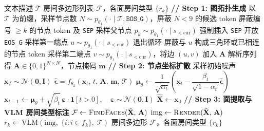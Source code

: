 \begin{algorithm}[H]
\caption{PlanDiffusion 推理}
\label{alg:inference}
\begin{algorithmic}[1]
\REQUIRE 文本描述 $\mathcal{T}$
\ENSURE 房间多边形列表 $\mathcal{F}$，各面房间类型 $\{r_k\}$
\STATE \textbf{// Step 1: 图拓扑生成}
\STATE 以 $\mathcal{T}$ 为前缀，采样节点数 $N \sim p_{\theta_1}(\cdot \mid \mathcal{T},\texttt{BOS\_G})$，屏蔽 $N < 9$ 的候选 token 
    \STATE 屏蔽编号 $\geq k$ 的节点 token 及 \texttt{SEP}
    \STATE 采样父节点 $p_k \sim p_{\theta_1}(\cdot \mid s_{<\mathrm{cur}})$ 
\ENDFOR
\STATE 强制插入 \texttt{SEP}
        \STATE 开放 \texttt{EOS\_G}
    \ENDIF
    \STATE 采样第一端点 $u \sim p_{\theta_1}(\cdot \mid s_{<\mathrm{cur}})$ 
        \STATE 退出循环
    \ELSE
        \STATE 屏蔽与 $u$ 构成三角环或已相连的节点 token
        \STATE 采样第二端点 $v \sim p_{\theta_1}(\cdot \mid s_{<\mathrm{cur}})$，将边 $(u,v)$ 加入 $\mathbf{A}$ 
    \ENDIF
\ENDWHILE
\STATE 解析序列得 $\mathbf{A} \in \{0,1\}^{N \times N}$，节点掩码 $\mathbf{m}$
\STATE \textbf{// Step 2: 节点坐标扩散}
\STATE 采样初始噪声 $\mathbf{x}_{T} \sim \mathcal{N}(\mathbf{0},\mathbf{I})$
    \STATE $\hat{\boldsymbol{\epsilon}} = f_{\theta_2}(\mathbf{x}_t,\, t,\, \mathbf{A},\, \mathbf{m},\, \mathcal{T})$
    \STATE $\boldsymbol{\mu}_\theta \leftarrow \dfrac{1}{\sqrt{\alpha_t}}\!\left(\mathbf{x}_t - \dfrac{\beta_t}{\sqrt{1-\bar{\alpha}_t}}\hat{\boldsymbol{\epsilon}}\right)$
    \STATE $\mathbf{x}_{t-1} \leftarrow \boldsymbol{\mu}_\theta + \sqrt{\tilde{\beta}_t}\,\boldsymbol{\varepsilon}\cdot\mathbf{1}[t>0],\quad \boldsymbol{\varepsilon}\sim\mathcal{N}(\mathbf{0},\mathbf{I})$
\ENDFOR
\STATE $\hat{\mathbf{X}} \leftarrow \mathbf{x}_{0}$ 
\STATE \textbf{// Step 3: 面提取与 VLM 房间类型标注}
\STATE $\mathcal{F} \leftarrow \textsc{FindFaces}(\hat{\mathbf{X}},\, \mathbf{A})$ 
\STATE $\mathrm{img} \leftarrow \textsc{Render}(\hat{\mathbf{X}},\, \mathbf{A})$ 
    \STATE $r_k \leftarrow \mathrm{VLM}\!\left(\mathrm{img},\; \{i : i \in f_k\},\; \mathcal{T}\right)$ 
\ENDFOR
\RETURN 房间多边形 $\mathcal{F}$，各面房间类型 $\{r_k\}$
\end{algorithmic}
\end{algorithm}
